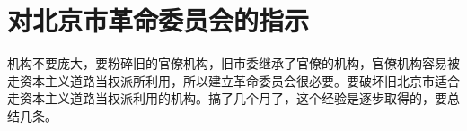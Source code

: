 \section[对北京市革命委员会的指示（一九六七年五月）]{对北京市革命委员会的指示}


机构不要庞大，要粉碎旧的官僚机构，旧市委继承了官僚的机构，官僚机构容易被走资本主义道路当权派所利用，所以建立革命委员会很必要。要破坏旧北京市适合走资本主义道路当权派利用的机构。搞了几个月了，这个经验是逐步取得的，要总结几条。


